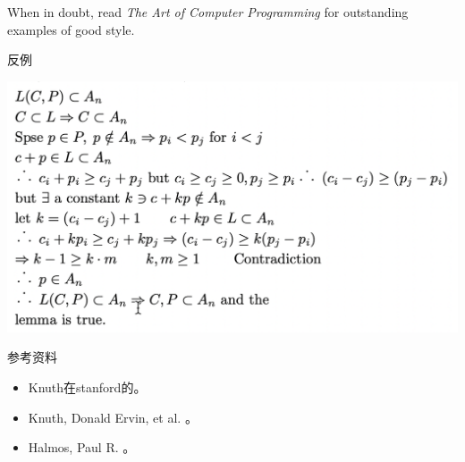 \documentclass[presentation]{beamer}
\begin{document}
\begin{frame}[label={sec:org122de54}]{27}
When in doubt, read \emph{The Art of Computer Programming} for outstanding examples of good style.
\end{frame}

\begin{frame}[label={sec:orgabba0d0}]{反例}
\begin{H}
\centering
\includegraphics[width=.8\textwidth]{./1.png}
\label{}
\end{H}
\end{frame}

\begin{frame}[label={sec:orgfdcc0fb}]{参考资料}
\begin{itemize}
\item Knuth在stanford的\href{https://www.youtube.com/watch?v=mert0kmZvVM}{\color{blue}{授课视频}}。
\item Knuth, Donald Ervin, et al. \href{https://jmlr.csail.mit.edu/reviewing-papers/knuth\_mathematical\_writing.pdf}{\color{blue}{Mathematical writing}}。
\item Halmos, Paul R.  \href{https://entropiesschool.sciencesconf.org/data/How\_to\_Write\_Mathematics.pdf}{\color{blue}{How to write mathematics}}。
\end{itemize}
\end{frame}
\end{document}
